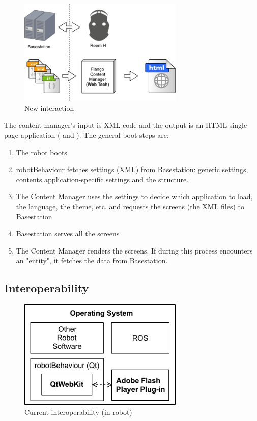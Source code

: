 \begin{figure}[htb]
    \label{fig:interaction-new}
    \centering
    \includegraphics[width=0.7\textwidth]{figures/interaction-new}
    \caption{New interaction}
\end{figure}

The content manager's input is \ac{XML} code and the output is an \ac{HTML} single page application ( and ).
The general boot steps are:

\begin{enumerate}
    \item The robot boots
    \item robotBehaviour fetches settings (\ac{XML}) from Basestation: generic settings, contents application-specific settings and the structure.
    \item The Content Manager uses the settings to decide which application to load, the language, the theme, etc. and requests the screens (the \ac{XML} files) to Basestation
    \item Basestation serves all the screens
    \item The Content Manager renders the screens. If during this process encounters an "entity", it fetches the data from Basestation.
\end{enumerate}


\subsection{Interoperability}
\begin{figure}[htb]
    \label{fig:interoperability-original}
    \centering
    \includegraphics[width=0.7\textwidth]{figures/interoperability-original}
    \caption{Current interoperability (in robot)}
\end{figure}

